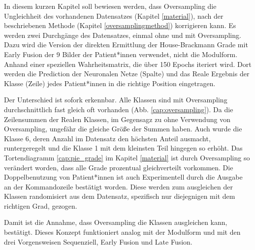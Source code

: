 In diesem kurzen Kapitel soll bewiesen werden, dass Oversampling die Ungleichheit des vorhandenen Datensatzes (Kapitel \ref{material}), nach der beschriebenen Methode (Kapitel \ref{oversamplingmethod}) korrigieren kann. Es werden zwei Durchgänge des Datensatzes, einmal ohne und mit Oversampling. Dazu wird die Version der direkten Ermittlung der House-Brackmann Grade mit Early Fusion der 9 Bilder der Patient*innen verwendet, nicht die Modulform. Anhand einer speziellen Wahrheitsmatrix, die über 150 Epochs iteriert wird. Dort werden die Prediction der Neuronalen Netze (Spalte) und das Reale Ergebnis der Klasse (Zeile) jedes Patient*innen in die richtige Position eingetragen.
\vspace{0.3cm}

Der Unterschied ist sofork erkennbar. Alle Klassen sind mit Oversampling durchschnittlich fast gleich oft vorhanden (Abb. \ref{cap:oversampling}). Da die Zeilensummen der Realen Klassen, im Gegensagz zu ohne Verwendung von Oversampling, ungefähr die gleiche Größe der Summen haben. Auch wurde die Klasse 6, deren Anzahl im Datensatz den höchsten Anteil ausmacht, runtergeregelt und die Klasse 1 mit dem kleinsten Teil hingegen so erhöht. Das Tortendiagramm \ref{cap:pie_grade} im Kapitel \ref{material}  ist durch Oversampling so verändert worden, dass alle Grade prozentual gleichverteilt vorkommen. Die Doppelbenutzung von Patient*innen ist auch Experimentell durch die Ausgabe an der Kommandozeile bestätigt worden. Diese werden zum ausgleichen der Klassen randomisiert aus dem Datensatz, spezifisch nur diejegnigen mit dem richtigen Grad, gezogen.

\vspace{0.3cm}

Damit ist die Annahme, dass Oversampling die Klassen ausgleichen kann, bestätigt. Dieses Konzept funktioniert analog mit der Modulform und mit den drei Vorgensweisen Sequenziell, Early Fusion und Late Fusion.




\clearpage
